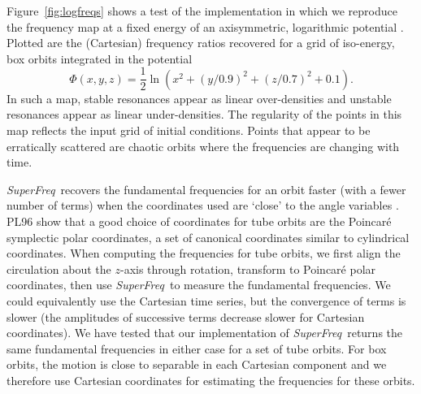 \documentclass[letterpaper,12pt,preprint]{aastex}
\newcommand{\project}[1]{\textsl{#1}}
\newcommand{\superfreq}{\project{SuperFreq}}
\begin{document}
Figure~\ref{fig:logfreqs} shows a test of the implementation in which we reproduce the frequency map at a fixed energy of an axisymmetric, logarithmic potential \cite[][pg. 260, Figure~3.45]{binneytremaine}. Plotted are the (Cartesian) frequency ratios recovered for a grid of iso-energy, box orbits integrated in the potential
\begin{equation}
	\Phi(x,y,z) = \frac{1}{2}\ln\left(x^2 + (y/0.9)^2 + (z/0.7)^2 + 0.1\right). \label{eq:logpotential}
\end{equation}
In such a map, stable resonances appear as linear over-densities and unstable resonances appear as linear under-densities. The regularity of the points in this map reflects the input grid of initial conditions. Points that appear to be erratically scattered are chaotic orbits where the frequencies are changing with time.

\superfreq\ recovers the fundamental frequencies for an orbit faster (with a fewer number of terms) when the coordinates used are `close' to the angle variables \cite[PL96;][]{papaphilippou96}. PL96 show that a good choice of coordinates for tube orbits are the Poincar\'e symplectic polar coordinates, a set of canonical coordinates similar to cylindrical coordinates. When computing the frequencies for tube orbits, we first align the circulation about the $z$-axis through rotation, transform to Poincar\'e polar coordinates, then use \superfreq\ to measure the fundamental frequencies. We could equivalently use the Cartesian time series, but the convergence of terms is slower (the amplitudes of successive terms decrease slower for Cartesian coordinates). We have tested that our implementation of \superfreq\ returns the same fundamental frequencies in either case for a set of tube orbits. For box orbits, the motion is close to separable in each Cartesian component and we therefore use Cartesian coordinates for estimating the frequencies for these orbits. 
\end{document}
